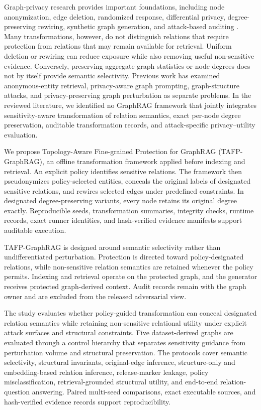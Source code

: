 \documentclass[preprint,12pt]{elsarticle}
\begin{document}
Graph-privacy research provides important foundations, including node anonymization, edge deletion, randomized response, differential privacy, degree-preserving rewiring, synthetic graph generation, and attack-based auditing \cite{ref02_annamalai_2024,ref03_casas_roma_2020,ref04_chien_2023,ref11_hidano_2024,ref12_hu_2022,ref17_jian_2023,ref20_li_2023,ref24_mannion_2024,ref25_mendonca_2025,ref26_mortazavi_2020,ref27_mueller_2023,ref36_xiang_2022,ref37_xiang_2025,ref38_yang_2021,ref43_zhang_2023}. Many transformations, however, do not distinguish relations that require protection from relations that may remain available for retrieval. Uniform deletion or rewiring can reduce exposure while also removing useful non-sensitive evidence. Conversely, preserving aggregate graph statistics or node degrees does not by itself provide semantic selectivity. Previous work has examined anonymous-entity retrieval, privacy-aware graph prompting, graph-structure attacks, and privacy-preserving graph perturbation as separate problems. In the reviewed literature, we identified no GraphRAG framework that jointly integrates sensitivity-aware transformation of relation semantics, exact per-node degree preservation, auditable transformation records, and attack-specific privacy--utility evaluation.

We propose Topology-Aware Fine-grained Protection for GraphRAG (TAFP-GraphRAG), an offline transformation framework applied before indexing and retrieval. An explicit policy identifies sensitive relations. The framework then pseudonymizes policy-selected entities, conceals the original labels of designated sensitive relations, and rewires selected edges under predefined constraints. In designated degree-preserving variants, every node retains its original degree exactly. Reproducible seeds, transformation summaries, integrity checks, runtime records, exact runner identities, and hash-verified evidence manifests support auditable execution.

TAFP-GraphRAG is designed around semantic selectivity rather than undifferentiated perturbation. Protection is directed toward policy-designated relations, while non-sensitive relation semantics are retained whenever the policy permits. Indexing and retrieval operate on the protected graph, and the generator receives protected graph-derived context. Audit records remain with the graph owner and are excluded from the released adversarial view.

The study evaluates whether policy-guided transformation can conceal designated relation semantics while retaining non-sensitive relational utility under explicit attack surfaces and structural constraints. Five dataset-derived graphs are evaluated through a control hierarchy that separates sensitivity guidance from perturbation volume and structural preservation. The protocols cover semantic selectivity, structural invariants, original-edge inference, structure-only and embedding-based relation inference, release-marker leakage, policy misclassification, retrieval-grounded structural utility, and end-to-end relation-question answering. Paired multi-seed comparisons, exact executable sources, and hash-verified evidence records support reproducibility.
\end{document}
